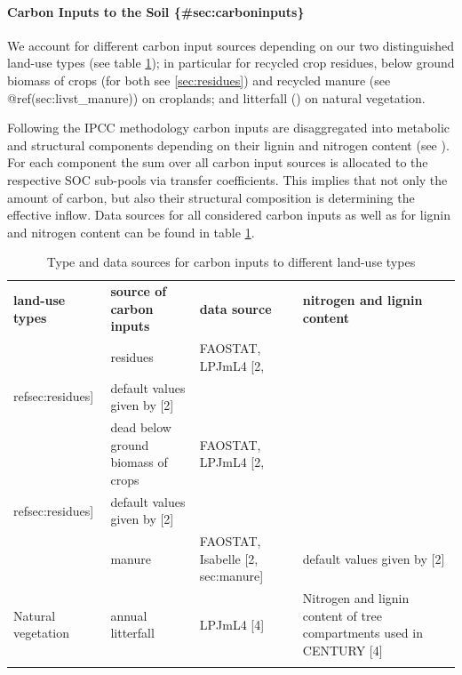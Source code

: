 \documentclass[gc, manuscript]{copernicus}
\begin{document}
\hypertarget{carbon-inputs-to-the-soil-seccarboninputs}{%
\paragraph*{Carbon Inputs to the Soil \{\#sec:carboninputs\}}\label{carbon-inputs-to-the-soil-seccarboninputs}}

We account for different carbon input sources depending on our two distinguished land-use types (see table \ref{tab:datasourceinputs}); in particular for recycled crop residues, below ground biomass of crops (for both see \ref{sec:residues}) and recycled manure (see @ref(sec:livst\_manure)) on croplands; and litterfall (\citep{LPJmL4_1}) on natural vegetation.

Following the IPCC methodology carbon inputs are disaggregated into metabolic and structural components depending on their lignin and nitrogen content (see \citep{ipcc_2019_2019}). For each component the sum over all carbon input sources is allocated to the respective SOC sub-pools via transfer coefficients. This implies that not only the amount of carbon, but also their structural composition is determining the effective inflow. Data sources for all considered carbon inputs as well as for lignin and nitrogen content can be found in table \ref{tab:datasourceinputs}.

 \begin{table}[h]
 \caption{Type and data sources for carbon inputs to different land-use types }
 \begin{tabular}{l l l l}
 \tophline
  \textbf{land-use types}   & \textbf{source of carbon inputs} & \textbf{data source} & \textbf{nitrogen and lignin content} \\
 \middlehline
 \multirow{3}{*}{Cropland} & residues & FAOSTAT, LPJmL4 [2, \\ref{sec:residues}] & default values given by [2]  \\
                            & dead below ground biomass of crops & FAOSTAT, LPJmL4 [2, \\ref{sec:residues}] & default values given by [2] \\
                            & manure & FAOSTAT, Isabelle [2, sec:manure] & default values given by [2] \\
                            \hline
  Natural vegetation        & annual litterfall & LPJmL4 [4]& \begin{minipage}[t]{0.28\columnwidth}\raggedright\strut Nitrogen and lignin content of tree compartments used in CENTURY [4] \strut \end{minipage}\tabularnewline
 \bottomhline
 \end{tabular}
 \belowtable{}
 \label{tab:datasourceinputs}
 \end{table}
\end{document}

